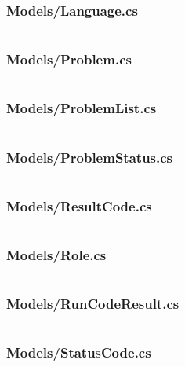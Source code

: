 \documentclass[a4paper]{report}
\begin{document}
\inputminted{csharp}{"../src/Algorithm Dynamics.Core/Models/Judger.cs"}

\subsubsection{Models/Language.cs}

\inputminted{csharp}{"../src/Algorithm Dynamics.Core/Models/Language.cs"}

\subsubsection{Models/Problem.cs}

\inputminted{csharp}{"../src/Algorithm Dynamics.Core/Models/Problem.cs"}

\subsubsection{Models/ProblemList.cs}

\inputminted{csharp}{"../src/Algorithm Dynamics.Core/Models/ProblemList.cs"}

\subsubsection{Models/ProblemStatus.cs}

\inputminted{csharp}{"../src/Algorithm Dynamics.Core/Models/ProblemStatus.cs"}

\subsubsection{Models/ResultCode.cs}

\inputminted{csharp}{"../src/Algorithm Dynamics.Core/Models/ResultCode.cs"}

\subsubsection{Models/Role.cs}

\inputminted{csharp}{"../src/Algorithm Dynamics.Core/Models/Role.cs"}

\subsubsection{Models/RunCodeResult.cs}

\inputminted{csharp}{"../src/Algorithm Dynamics.Core/Models/RunCodeResult.cs"}

\subsubsection{Models/StatusCode.cs}
\end{document}
